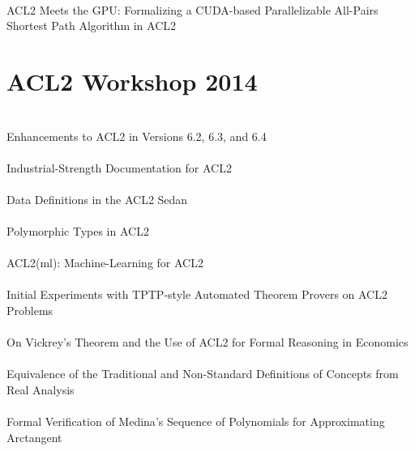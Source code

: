 \documentclass{article}
\begin{document}
\cite{13-hardin-cuda} \\
{ACL2} Meets the {GPU}: Formalizing a {CUDA}-based Parallelizable All-Pairs Shortest Path Algorithm in {ACL2} \\


\section{ACL2 Workshop 2014}

\cite{14-kaufmann-enhancements} \\
Enhancements to {ACL2} in Versions 6.2, 6.3, and 6.4 \\

\cite{14-davis-xdoc} \\
Industrial-Strength Documentation for {ACL2} \\

\cite{14-chamarthi-defdata} \\
Data Definitions in the {ACL2 Sedan} \\

\cite{14-selfridge-polymorphic} \\
Polymorphic Types in {ACL2} \\

\cite{14-heras-ml} \\
{ACL2(ml)}: Machine-Learning for {ACL2} \\

\cite{14-joosten-tptp} \\
Initial Experiments with {TPTP}-style Automated Theorem Provers on {ACL2} Problems \\

\cite{14-gamboa-economics} \\
On {Vickrey}'s Theorem and the Use of {ACL2} for Formal Reasoning in Economics \\

\cite{14-cowles-equivalence} \\
Equivalence of the Traditional and Non-Standard Definitions of Concepts from Real Analysis \\

\cite{14-gamboa-arctangent} \\
Formal Verification of {Medina}'s Sequence of Polynomials for Approximating Arctangent \\
\end{document}
